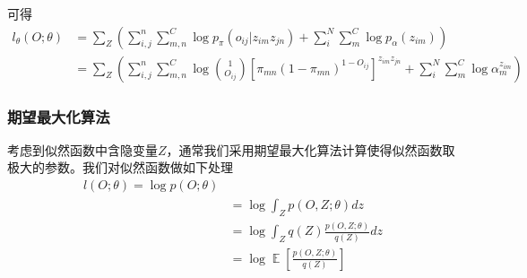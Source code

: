 可得
\begin{equation}\begin{aligned}
l_\theta(O;\theta) &= \sum_Z(\sum_{i,j}^{n}\sum_{m,n}^C\log p_\pi(o_{ij}|z_{im}z_{jn})+\sum_{i}^N\sum_m^C\log p_\alpha(z_
{im}))\\ &=\sum_Z(\sum_{i,j}^{n}\sum_{m,n}^C\log \binom{1}{O_{ij}}[\pi_{mn}(1-\pi_{mn})^{1-O_{ij}}]^{ z_{im}z_{jn}}+\sum_
{i}^N\sum_m^C\log\alpha_m^{z_{im}})
\end{aligned}\end{equation}
\subsubsection{期望最大化算法}

考虑到似然函数中含隐变量$Z$，通常我们采用期望最大化算法\cite{dempster_maximum_1977}计算使得似然函数取极大的参数。我们对似然函数做如下处理
\begin{equation}\begin{aligned}
    l(O;\theta)=\log p(O;\theta)\\
&=\log \int_Zp(O,Z;\theta)dz\\
&=\log \int_Z q(Z)\frac{p(O,Z;\theta)}{q(Z)}dz\\
&=\log \mathop{\mathbb{E}}[\frac{p(O,Z;\theta)}{q(Z)}]
\end{aligned}\end{equation}


